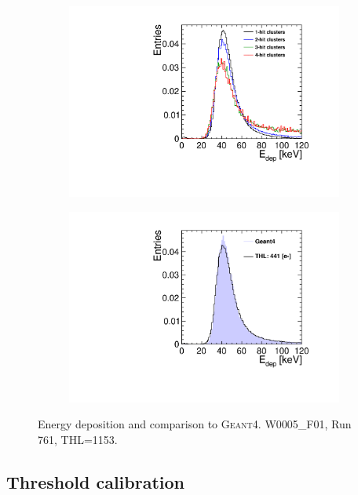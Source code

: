 \begin{figure}[htbp] \centering
  \begin{subfigure}[b]{0.45\textwidth}
    \includegraphics[width=\textwidth]{./figures/Calibration/Edep_Clusters_W0005_F01.pdf}
    \caption{}
  \end{subfigure}\hfill
  \begin{subfigure}[b]{0.45\textwidth}
    \includegraphics[width=\textwidth]{./figures/Calibration/Edep_G4_W0005_F01.pdf}
    \caption{}
  \end{subfigure}
  \caption{Energy deposition and comparison to
    \textsc{Geant4}. W0005\_F01, Run 761, THL=1153.}
  \label{fig:EdepW19L8}
\end{figure}

\subsection{Threshold calibration} \label{sec:threshold}


